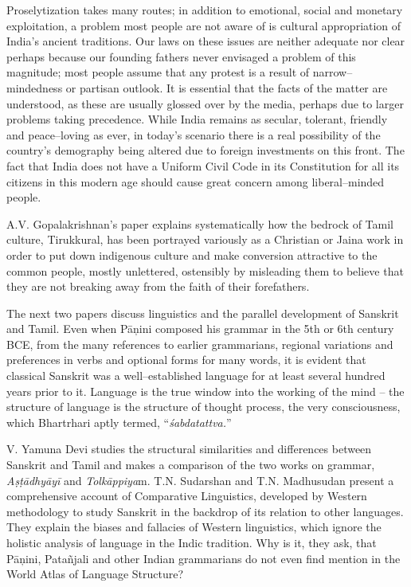 Proselytization takes many routes; in addition to emotional, social and monetary exploitation, a problem most people are not aware of is cultural appropriation of India’s ancient traditions. Our laws on these issues are neither adequate nor clear perhaps because our founding fathers never envisaged a problem of this magnitude; most people assume that any protest is a result of narrow–mindedness or partisan outlook. It is essential that the facts of the matter are understood, as these are usually glossed over by the media, perhaps due to larger problems taking precedence. While India remains as secular, tolerant, friendly and peace–loving as ever, in today’s scenario there is a real possibility of the country’s demography being altered due to foreign investments on this front. The fact that India does not have a Uniform Civil Code in its Constitution for all its citizens in this modern age should cause great concern among liberal–minded people.

A.V. Gopalakrishnan’s paper explains systematically how the bedrock of Tamil culture, Tirukkural, has been portrayed variously as a Christian or Jaina work in order to put down indigenous culture and make conversion attractive to the common people, mostly unlettered, ostensibly by misleading them to believe that they are not breaking away from the faith of their forefathers.

The next two papers discuss linguistics and the parallel development of Sanskrit and Tamil. Even when Pāņini composed his grammar in the 5th or 6th century BCE, from the many references to earlier grammarians, regional variations and preferences in verbs and optional forms for many words, it is evident that classical Sanskrit was a well–established language for at least several hundred years prior to it. Language is the true window into the working of the mind – the structure of language is the structure of thought process, the very consciousness, which Bhartrhari aptly termed, “\textit{śabdatattva.}”

V. Yamuna Devi studies the structural similarities and differences between Sanskrit and Tamil and makes a comparison of the two works on grammar, \textit{Aṣṭādhyāyī} and \textit{Tolkāppiya}m. T.N. Sudarshan and T.N. Madhusudan present a comprehensive account of Comparative Linguistics, developed by Western methodology to study Sanskrit in the backdrop of its relation to other languages. They explain the biases and fallacies of Western linguistics, which ignore the holistic analysis of language in the Indic tradition. Why is it, they ask, that Pāņini, Patañjali and other Indian grammarians do not even find mention in the World Atlas of Language Structure?

